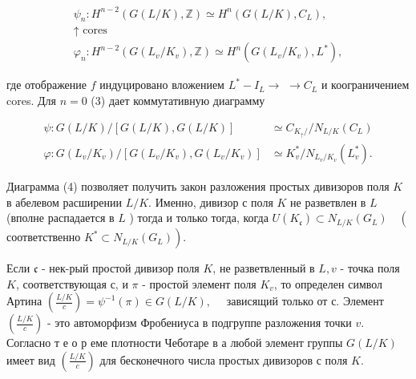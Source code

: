 \documentclass[10pt]{article}
\begin{document}
\[

\begin{gathered}

\psi_{n}: H^{n-2}(G(L / K), \mathbb{Z}) \simeq H^{n}\left(G(L / K), C_{L}\right), \\

\uparrow \text { cores } \\

\varphi_{n}: H^{n-2}\left(G\left(L_{v} / K_{v}\right), \mathbb{Z}\right) \simeq H^{n}\left(G\left(L_{v} / K_{v}\right), L^{*}\right),

\end{gathered}

\]



где отображение $f$ индуцировано вложением $L^{*}-I_{L} \rightarrow$ $\rightarrow C_{L}$ и коограничением cores. Для $n=0$ (3) дает коммутативную диаграмму



\[

\begin{aligned}

\psi: G(L / K) /[G(L / K), G(L / K)] & \simeq C_{K_{\uparrow} /} / N_{L / K}\left(C_{L}\right) \\

\varphi: G\left(L_{v} / K_{v}\right) /\left[G\left(L_{v} / K_{v}\right), G\left(L_{v} / K_{v}\right)\right] & \simeq K_{v}^{*} / N_{L_{v} / K_{v}}\left(L_{v}^{*}\right) .

\end{aligned}

\]



Диаграмма (4) позволяет получить закон разложения простых дивизоров поля $K$ в абелевом расширении $L / K$. Именно, дивизор с поля $K$ не разветвлен в $L$ (вполне распадается в $L$ ) тогда и только тогда, когда $U\left(K_{\mathfrak{c}}\right) \subset N_{L / K}\left(G_{L}\right) \quad\left(\right.$ соответственно $\left.K^{*} \subset N_{L / K}\left(G_{L}\right)\right)$.



Если $\mathfrak{c}$ - нек-рый простой дивизор поля $K$, не разветвленный в $L, v$ - точка поля $K$, соответствующая с, и $\pi$ - простой элемент поля $K_{v}$, то определен символ Артина $\left(\frac{L / K}{c}\right)=\psi^{-1}(\pi) \in G(L / K), \quad$ зависящий только от с. Элемент $\left(\frac{L / K}{c}\right)$ - это автоморфизм Фробениуса в подгруппе разложения точки $v$. Согласно т е о р еме плотности Чеботаре в а любой элемент группы $G(L / K)$ имеет вид $\left(\frac{L / K}{c}\right)$ для бесконечного числа простых дивизоров с поля $K$.
\end{document}
